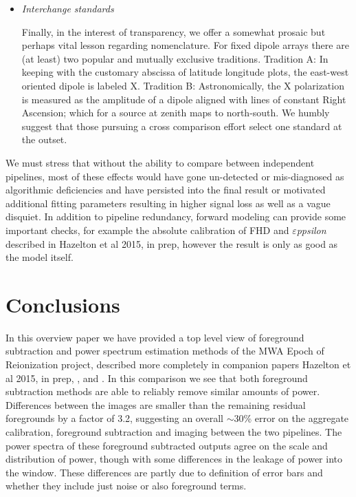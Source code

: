 \documentclass[twolcolumn,iop]{emulateapj}
\def\eppsilon{{\it $\varepsilon$ppsilon}}
\def\chipscite{\cite{2016arXiv160102073T}}
\def\eppsiloncite{Hazelton et al 2015, in prep}
\def\dilloncite{\cite{PhysRevD.91.123011} }
\begin{document}
\begin{itemize}
\item \emph{Interchange standards}

Finally, in the interest of transparency, we offer a somewhat prosaic but perhaps vital lesson regarding  nomenclature. For fixed dipole arrays there are (at least) two popular and mutually exclusive traditions. Tradition A: In keeping with the customary abscissa of latitude longitude plots, the east-west oriented dipole is labeled X.  Tradition B: Astronomically, the X polarization is measured as the amplitude of a dipole aligned with lines of constant Right Ascension; which for a source at zenith maps to north-south. We humbly suggest that those pursuing a cross comparison effort select one standard at the outset.  

\end{itemize}






  We must stress that without the ability to compare between independent pipelines, most of these effects would have gone un-detected or mis-diagnosed as algorithmic deficiencies and have persisted into the final result or motivated additional fitting parameters resulting in higher signal loss as well as a vague disquiet. In addition to pipeline redundancy, forward modeling can provide some important checks, for example the absolute calibration of FHD and \eppsilon{} described in \eppsiloncite{}, however the result is only as good as the model itself.
  
\section{Conclusions}
\label{sec:conclusion}
In this overview paper we have provided a top level view of foreground subtraction and power spectrum estimation methods of the MWA Epoch of Reionization project, described more completely in companion papers \eppsiloncite{}, \chipscite{}, and \dilloncite{}.  In this comparison we see that both foreground subtraction methods are able to reliably remove similar amounts of power.  Differences between the images are smaller than the remaining residual foregrounds by a factor of 3.2, suggesting an overall $\sim$30\% error on the aggregate calibration, foreground subtraction and imaging between the two pipelines.  The power spectra of these foreground subtracted outputs agree on the scale and distribution of power, though with some differences in the leakage of power into the window. These differences are partly due to definition of error bars and whether they include just noise or also foreground terms.  
\end{document}
